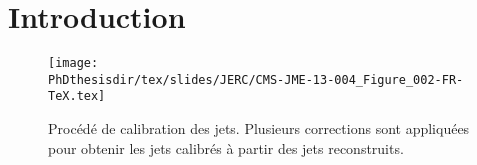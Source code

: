 \section{Introduction}

\begin{figure}[h]
\centering
\texttt{[image: \\PhDthesisdir/tex/slides/JERC/CMS-JME-13-004\_Figure\_002-FR-TeX.tex]}
\caption{Procédé de calibration des jets. Plusieurs corrections sont appliquées pour obtenir les jets calibrés à partir des jets reconstruits.}
\label{fig-CMS-JME-13-004_Figure_002-FR-TeX}
\end{figure}